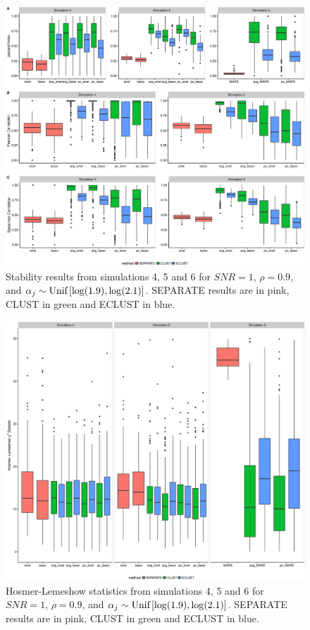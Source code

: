 \begin{appendices}
\begin{figure}[H]
	\centering
	\includegraphics[scale=0.40, keepaspectratio]{./figs/guillimin/results/figures/sim4-5-6-combined/stability_sim456.eps}
	\caption{Stability results from simulations 4, 5 and 6 for $SNR=1$, $\rho = 0.9$, and \mbox{$\alpha_{j} \sim \textrm{{Unif}}\left[\log(1.9), \log(2.1)\right]$}. SEPARATE results are in pink, CLUST in green and ECLUST in blue.}
	\label{fig:sim-stability456}
\end{figure}

\begin{figure}[H]
	\centering
	\includegraphics[scale=0.40, keepaspectratio]{./figs/guillimin/results/figures/sim4-5-6-combined/calibration_sim456.eps}
	\caption{Hosmer-Lemeshow statistics from simulations 4, 5 and 6 for $SNR=1$, $\rho = 0.9$, and \mbox{$\alpha_{j} \sim \textrm{{Unif}}\left[\log(1.9), \log(2.1)\right]$}. SEPARATE results are in pink, CLUST in green and ECLUST in blue.}
	\label{fig:sim-calibration456}
\end{figure}



\end{appendices}
